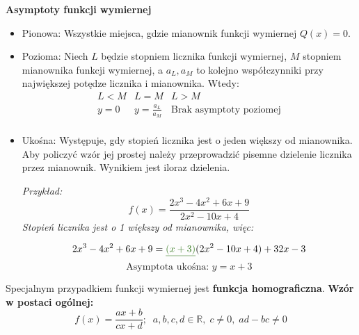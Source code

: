 \documentclass[14pt,a4paper]{extarticle}
\begin{document}
\noindent\textbf{Asymptoty funkcji wymiernej}
\begin{itemize}
   \item Pionowa:\hfill\break
   Wszystkie miejsca, gdzie mianownik funkcji wymiernej $Q(x) = 0$.
   \item Pozioma:\hfill\break
   Niech $L$ będzie stopniem licznika funkcji wymiernej, $M$ stopniem mianownika funkcji wymiernej, a $a_{L}, a_{M}$ to kolejno
   współczynniki przy największej potędze licznika i mianownika.
   Wtedy:\hfill\break
   \begin{equation*}      
   \begin{array}{c|c|c}
      L < M & L = M & L > M\\
      \hline
      y = 0 & y = \frac{\displaystyle a_{L}}{\displaystyle a_{M}} & \text{Brak asymptoty poziomej}\\
   \end{array}
   \end{equation*}
   \item Ukośna:\hfill\break
   Występuje, gdy stopień licznika jest o jeden większy od mianownika.
   Aby policzyć wzór jej prostej należy przeprowadzić pisemne dzielenie licznika przez mianownik.
   Wynikiem jest iloraz dzielenia.

   \newpage
\textit{Przykład:}
$$f(x) = \frac{2x^{3}-4x^{2}+6x+9}{2x^{2}-10x+4}$$\hfill\break
\textit{Stopień licznika jest o 1 większy od mianownika, więc:}
   \begin{center}
   \end{center}\hfill\break
$$2x^{3}-4x^{2}+6x+9 = \textcolor{OliveGreen}{\underline{(x+3)}}(2x^{2}-10x+4)+32x - 3$$
$$\text{Asymptota ukośna: }y = x + 3$$

\end{itemize}\hfill\break
\smallskip

\noindent Specjalnym przypadkiem funkcji wymiernej jest \textbf{funkcja homograficzna}.\hfill\break
\textbf{Wzór w postaci ogólnej:}
$$f(x) = \frac{ax + b}{cx + d};\;\;a, b, c, d \in \mathbb{R},\;c\neq 0,\; ad - bc \neq 0$$
   
\end{document}
